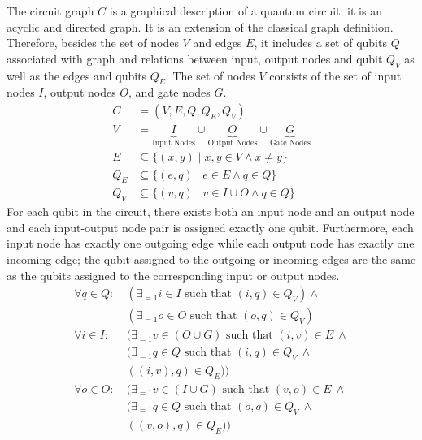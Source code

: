 The circuit graph $C$ is a graphical description of a quantum circuit; it is an acyclic and directed graph. It is an extension of the classical graph definition. Therefore, besides the set of nodes $V$ and edges $E$, it includes a set of qubits $Q$ associated with graph and relations between input, output nodes and qubit $Q_V$ as well as the edges and qubits $Q_E$. The set of nodes $V$ consists of the set of input nodes $I$, output nodes $O$, and gate nodes $G$.
\begin{align*}
    C &= (V, E, Q, Q_E, Q_V)\\
    V &= \underbrace{I}_{\text{Input Nodes}} \cup \underbrace{O}_{\text{Output Nodes}} \cup \underbrace{G}_{\text{Gate Nodes}}\\
    E &\subseteq \{ (x, y) \mid x,y \in V \land x \neq y \}\\
    Q_E &\subseteq \{ (e, q) \mid e \in E \land q \in Q \}\\
    Q_V &\subseteq \{ (v, q) \mid v \in I \cup O \land q \in Q \}
\end{align*}
For each qubit in the circuit, there exists both an input node and an output node and each input-output node pair is assigned exactly one qubit.
Furthermore, each input node has exactly one outgoing edge while each output node has exactly one incoming edge; the qubit assigned to the outgoing or incoming edges are the same as the qubits assigned to the corresponding input or output nodes.  
\begin{align*}
    \forall q \in Q :\ & (\exists_{=1} i \in I \text{ such that } (i, q) \in Q_V) \land\\
                       & (\exists_{=1} o \in O \text{ such that } (o, q) \in Q_V) \\
    \forall i \in I :\ & (\exists_{=1} v \in (O \cup G) \text{ such that } (i, v) \in E  \ \land\\
                       & (\exists_{=1} q \in Q \text{ such that } (i, q) \in Q_V \ \land \\
                       &  ((i, v), q) \in Q_E))\\
    \forall o \in O :\ & (\exists_{=1} v \in (I \cup G) \text{ such that } (v, o) \in E \ \land\\
                       & (\exists_{=1} q \in Q \text{ such that } (o, q) \in Q_V \ \land \\
                       &  ((v, o), q) \in Q_E))
\end{align*}

